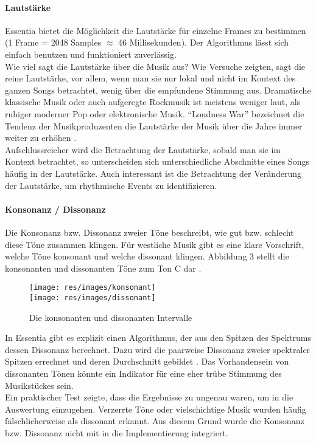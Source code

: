 \documentclass[11pt,a4paper]{article}
\begin{document}
\paragraph{Lautstärke}
Essentia bietet die Möglichkeit die Lautstärke für einzelne Frames  zu bestimmen (1 Frame = 2048 Samples $\approx$ 46 Millisekunden). Der Algorithmus lässt sich einfach benutzen und funktioniert zuverlässig.\\
Wie viel sagt die Lautstärke über die Musik aus? Wie Versuche zeigten, sagt die reine Lautstärke, vor allem, wenn man sie nur lokal und nicht im Kontext des ganzen Songs betrachtet, wenig über die empfundene Stimmung aus. Dramatische klassische Musik oder auch aufgeregte Rockmusik ist meistens weniger laut, als ruhiger moderner Pop oder elektronische Musik. ``Loudness War'' bezeichnet die Tendenz der Musikproduzenten die Lautstärke der Musik über die Jahre immer weiter zu erhöhen \cite{683ea11abc74c43c6680cd4c08dc538caee546575b59c2f40d70033cf3389ec8}.\\
Aufschlussreicher wird die Betrachtung der Lautstärke, sobald man sie im Kontext betrachtet, so unterscheiden sich unterschiedliche Abschnitte eines Songs häufig in der Lautstärke. Auch interessant ist die Betrachtung der Veränderung der Lautstärke, um rhythmische Events zu identifizieren.
\paragraph{Konsonanz / Dissonanz}
Die Konsonanz bzw. Dissonanz zweier Töne beschreibt, wie gut bzw. schlecht diese Töne zusammen klingen. Für westliche Musik gibt es eine klare Vorschrift, welche Töne konsonant und welche dissonant klingen. Abbildung 3 stellt die konsonanten und dissonanten Töne zum Ton C dar \cite{89a5aac0af37ff45f55cd59468ed3b0a5f30cbb229bb691b7970477c14dbe1af}.
\begin{figure}[ht]
\texttt{[image: res/images/konsonant]}
\vspace{5pt}\\
\texttt{[image: res/images/dissonant]}
\caption[Konsonante und Dissonante Intervalle]{Die konsonanten und dissonanten Intervalle}
\end{figure}
In Essentia gibt es explizit einen Algorithmus, der aus den Spitzen des Spektrums dessen Dissonanz berechnet. Dazu wird die paarweise Dissonanz zweier spektraler Spitzen errechnet und deren Durchschnitt gebildet \cite{EssentiaDissonance}. Das Vorhandensein von dissonanten Tönen könnte ein Indikator für eine eher trübe Stimmung des Musikstückes sein.\\
Ein praktischer Test zeigte, dass die Ergebnisse zu ungenau waren, um in die Auswertung einzugehen. Verzerrte Töne oder vielschichtige Musik wurden häufig fälschlicherweise als dissonant erkannt. Aus diesem Grund wurde die Konsonanz bzw. Dissonanz nicht mit in die Implementierung integriert.
\end{document}
